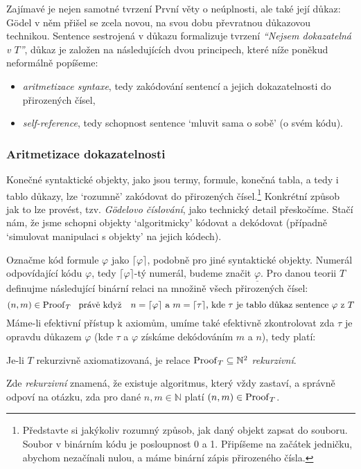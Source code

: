 Zajímavé je nejen samotné tvrzení První věty o neúplnosti, ale také její důkaz: Gödel v něm přišel se zcela novou, na svou dobu převratnou důkazovou technikou. Sentence sestrojená v důkazu formalizuje tvrzení \emph{``Nejsem dokazatelná v $T$''}, důkaz je založen na následujících dvou principech, které níže poněkud neformálně popíšeme:
\begin{itemize}
    \item \emph{aritmetizace syntaxe}, tedy zakódování sentencí a jejich dokazatelnosti do přirozených čísel,
    \item \emph{self-reference}, tedy schopnost sentence `mluvit sama o sobě' (o svém kódu).
\end{itemize}

\subsubsection*{Aritmetizace dokazatelnosti}

Konečné syntaktické objekty, jako jsou termy, formule, konečná tabla, a tedy i tablo důkazy, lze `rozumně' zakódovat do přirozených čísel.\footnote{Představte si jakýkoliv rozumný způsob, jak daný objekt zapsat do souboru. Soubor v binárním kódu je posloupnost 0 a 1. Připíšeme na začátek jedničku, abychom nezačínali nulou, a máme binární zápis přirozeného čísla.} Konkrétní způsob jak to lze provést, tzv. \emph{Gödelovo číslování}, jako technický detail přeskočíme. Stačí nám, že jsme schopni objekty `algoritmicky' kódovat a dekódovat (případně `simulovat manipulaci s objekty' na jejich kódech).

Označme kód formule $\varphi$ jako $\lceil\varphi\rceil$, podobně pro jiné syntaktické objekty. Numerál odpovídající kódu $\varphi$, tedy $\lceil\varphi\rceil$-tý numerál, budeme značit $\underline{\varphi}$. Pro danou teorii $T$ definujme následující binární relaci na množině všech přirozených čísel:
$$
(n,m)\in\Proof_T\ \text{ právě když \ \ $n=\lceil\varphi\rceil$ a $m=\lceil\tau\rceil$, kde $\tau$ je tablo důkaz sentence $\varphi$ z $T$}
$$
Máme-li efektivní přístup k axiomům, umíme také efektivně zkontrolovat zda $\tau$ je opravdu důkazem $\varphi$ (kde $\tau$ a $\varphi$ získáme dekódováním $m$ a $n$), tedy platí:
\begin{observation}
Je-li $T$ rekurzivně axiomatizovaná, je relace $\operatorname{Proof}_T\subseteq\mathbb N^2$ \emph{rekurzivní}. 
\end{observation}
Zde \emph{rekurzivní} znamená, že existuje algoritmus, který vždy zastaví, a správně odpoví na otázku, zda pro dané $n,m\in\mathbb N$ platí $(n,m)\in\operatorname{Proof}_T$.

